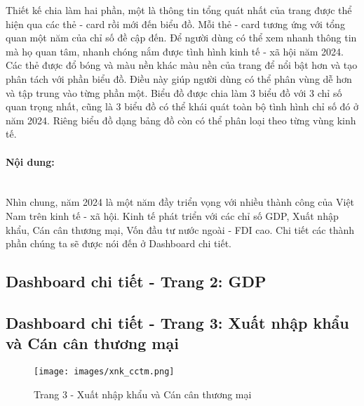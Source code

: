 \documentclass[a4paper]{report}
\begin{document}
{{Thiết kế chia làm hai phần, một là thông tin tổng quát nhất của trang được thể hiện qua các thẻ - card rồi mới đến biểu đồ. Mỗi thẻ - card tương ứng với tổng quan một năm của chỉ số đề cập đến.
Để người dùng có thể xem nhanh thông tin mà họ quan tâm, nhanh chóng nắm được tình hình kinh tế - xã hội năm 2024. Các thẻ được đổ bóng và màu nền khác màu nền của trang để nổi bật hơn và tạo phân tách với phần biểu đồ. Điều này giúp người dùng có thể phân vùng dễ hơn và tập trung vào từng phần một.
Biểu đồ được chia làm 3 biểu đồ với 3 chỉ số quan trọng nhất, cũng là 3 biểu đồ có thể khái quát toàn bộ tình hình chỉ số đó ở năm 2024. Riêng biểu đồ dạng bảng đồ còn có thể phân loại theo từng vùng kinh tế.\\

\paragraph{Nội dung:} \mbox{}\\

Nhìn chung, năm 2024 là một năm đầy triển vọng với nhiều thành công của Việt Nam trên kinh tế - xã hội. Kinh tế phát triển với các chỉ số GDP, Xuất nhập khẩu, Cán cân thương mại, Vốn đầu tư nước ngoài - FDI cao. Chi tiết các thành phần chúng ta sẽ được nói đến ở Dashboard chi tiết.\\

\subsection{Dashboard chi tiết - Trang 2: GDP}


\newpage
\subsection{Dashboard chi tiết - Trang 3: Xuất nhập khẩu và Cán cân thương mại}


\begin{figure}[H]
    \centering
    \texttt{[image: images/xnk\_cctm.png]}
    \caption{Trang 3 - Xuất nhập khẩu và Cán cân thương mại}
    \label{fig:enter-label}
\end{figure}


}}
\end{document}
